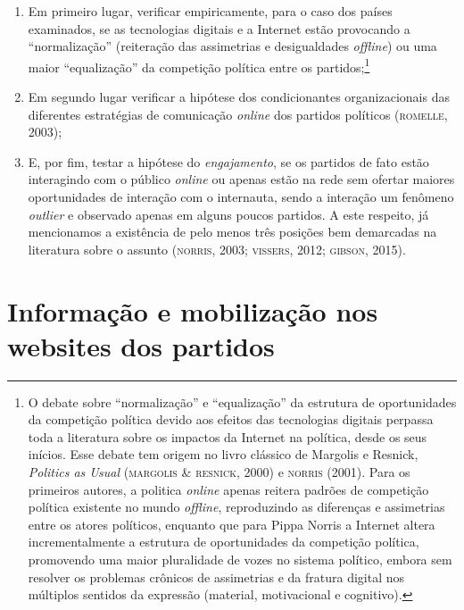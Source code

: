 \begin{enumerate}
\item Em primeiro lugar, verificar empiricamente, para o caso dos países
examinados, se as tecnologias digitais e a Internet estão provocando a
``normalização'' (reiteração das assimetrias e desigualdades \emph{offline})
ou uma maior ``equalização'' da competição política entre os
partidos;\footnote{O debate sobre ``normalização'' e ``equalização'' da
  estrutura de oportunidades da competição política devido aos efeitos
  das tecnologias digitais perpassa toda a literatura sobre os impactos
  da Internet na política, desde os seus inícios. Esse debate tem origem
  no livro clássico de Margolis e Resnick, \emph{Politics as Usual}
  (\textsc{margolis \& resnick}, 2000) e \textsc{norris} (2001). Para os primeiros
  autores, a politica \emph{online} apenas reitera padrões de competição
  política existente no mundo \emph{offline}, reproduzindo as diferenças
  e assimetrias entre os atores políticos, enquanto que para Pippa
  Norris a Internet altera incrementalmente a estrutura de oportunidades
  da competição política, promovendo uma maior pluralidade de vozes no
  sistema político, embora sem resolver os problemas crônicos de
  assimetrias e da fratura digital nos múltiplos sentidos da expressão
  (material, motivacional e cognitivo).}

\item Em segundo lugar verificar a hipótese dos condicionantes
organizacionais das diferentes estratégias de comunicação \emph{online} dos
partidos políticos (\textsc{romelle}, 2003);

\item E, por fim, testar a hipótese do \textit{engajamento}, se os
partidos de fato estão interagindo com o público \emph{online} ou apenas estão
na rede sem ofertar maiores oportunidades de interação com o internauta,
sendo a interação um fenômeno \textit{outlier} e observado apenas em alguns
poucos partidos. A este respeito, já mencionamos a existência de pelo
menos três posições bem demarcadas na literatura sobre o assunto
(\textsc{norris}, 2003; \textsc{vissers}, 2012; \textsc{gibson}, 2015).
\end{enumerate}

\section{Informação e mobilização nos websites dos partidos}


